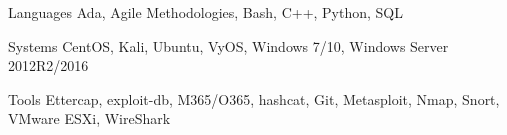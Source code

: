 



\begin{cvskills}
  \cvskill
    {Languages} %
     {Ada, Agile Methodologies, Bash, C++, Python, SQL} %

  \cvskill
    {Systems} %
    {CentOS, Kali, Ubuntu, VyOS, Windows 7/10, Windows Server 2012R2/2016}

  \cvskill
     {Tools}
     {Ettercap, exploit-db, M365/O365, hashcat, Git, Metasploit, Nmap, Snort, VMware ESXi, WireShark}






\end{cvskills}
